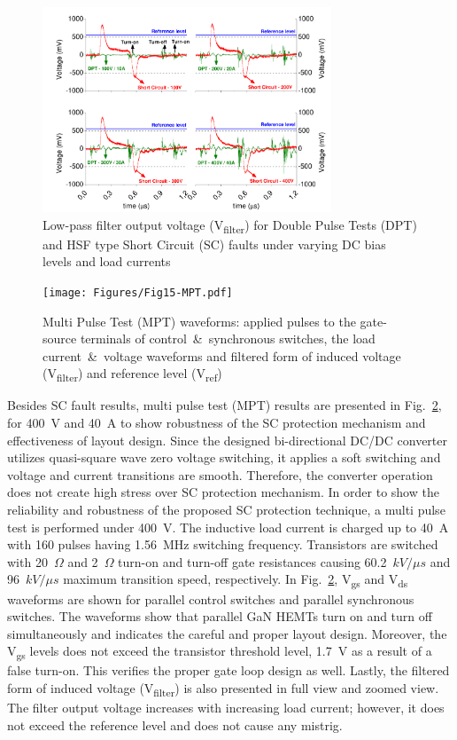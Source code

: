 \documentclass[journal]{IEEEtran}
\begin{document}
\begin{figure}[]
\centering
\includegraphics[width=3.4in]{Figures/Fig14-DPTandSCPVfiltouts.pdf}
\caption{Low-pass filter output voltage (V\textsubscript{filter}) for Double Pulse Tests (DPT) and HSF type Short Circuit (SC) faults under varying DC bias levels and load currents}
\label{fig_scp_vfiltouts}
\end{figure}

\begin{figure}[]
\centering
\texttt{[image: Figures/Fig15-MPT.pdf]}
\caption{Multi Pulse Test (MPT) waveforms: applied pulses to the gate-source terminals of control~\&~synchronous switches,  the load current~\&~voltage waveforms and filtered form of induced voltage (V\textsubscript{filter}) and reference level (V\textsubscript{ref})}
\label{fig_switching_ton}
\end{figure}

Besides SC fault results, multi pulse test (MPT) results are presented in Fig.~\ref{fig_switching_ton}, for 400~V and 40~A to show robustness of the SC protection mechanism and effectiveness of layout design. Since the designed bi-directional DC/DC converter utilizes quasi-square wave zero voltage switching, it applies a soft switching and voltage and current transitions are smooth. Therefore, the converter operation does not create high stress over SC protection mechanism. In order to show the reliability and robustness of the proposed SC protection technique, a multi pulse test is performed under 400~V. The inductive load current is charged up to 40~A with 160 pulses having 1.56~MHz switching frequency. Transistors are switched with 20~$\Omega$ and 2~$\Omega$ turn-on and turn-off gate resistances causing 60.2~$kV/\mu s$ and 96~$kV/\mu s$ maximum transition speed, respectively. In Fig.~\ref{fig_switching_ton}, V\textsubscript{gs} and V\textsubscript{ds} waveforms are shown for parallel control switches and parallel synchronous switches. The waveforms show that parallel GaN HEMTs turn on and turn off simultaneously and indicates the careful and proper layout design. Moreover, the V\textsubscript{gs} levels does not exceed the transistor threshold level, 1.7~V as a result of a false turn-on. This verifies the proper gate loop design as well. Lastly, the filtered form of induced voltage (V\textsubscript{filter}) is also presented in full view and zoomed view. The filter output voltage increases with increasing load current; however, it does not exceed the reference level and does not cause any mistrig.
\end{document}
